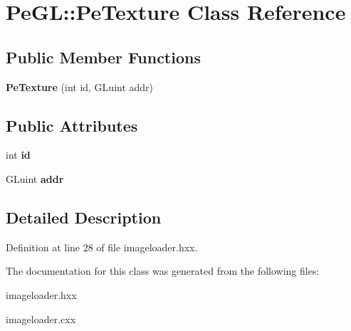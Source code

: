 \hypertarget{classPeGL_1_1PeTexture}{\section{Pe\-G\-L\-:\-:Pe\-Texture Class Reference}
\label{classPeGL_1_1PeTexture}
}
\subsection*{Public Member Functions}
\begin{DoxyCompactItemize}
\item 
\hypertarget{classPeGL_1_1PeTexture_aa59ece0f0ab2d71543700ccabda13c4a}{{\bfseries Pe\-Texture} (int id, G\-Luint addr)}\label{classPeGL_1_1PeTexture_aa59ece0f0ab2d71543700ccabda13c4a}

\end{DoxyCompactItemize}
\subsection*{Public Attributes}
\begin{DoxyCompactItemize}
\item 
\hypertarget{classPeGL_1_1PeTexture_a7295aa38a0fb0db3a6a77c592fb3e868}{int {\bfseries id}}\label{classPeGL_1_1PeTexture_a7295aa38a0fb0db3a6a77c592fb3e868}

\item 
\hypertarget{classPeGL_1_1PeTexture_a09f655f6deb304d201dd2b894cabe0f3}{G\-Luint {\bfseries addr}}\label{classPeGL_1_1PeTexture_a09f655f6deb304d201dd2b894cabe0f3}

\end{DoxyCompactItemize}


\subsection{Detailed Description}


Definition at line 28 of file imageloader.\-hxx.



The documentation for this class was generated from the following files\-:\begin{DoxyCompactItemize}
\item 
imageloader.\-hxx\item 
imageloader.\-cxx\end{DoxyCompactItemize}
